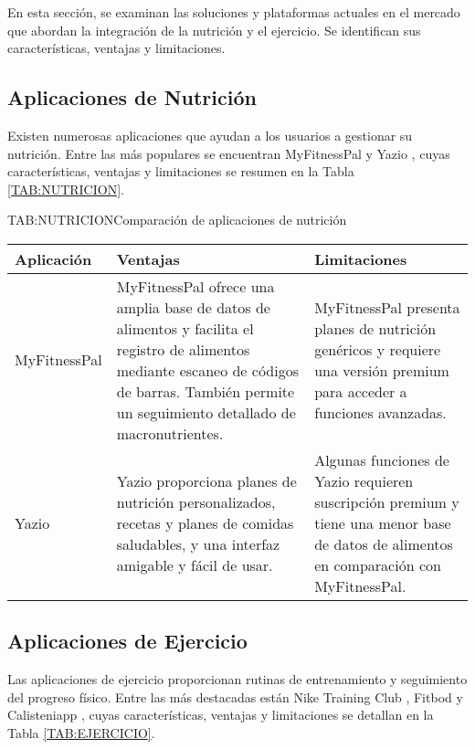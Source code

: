 En esta sección, se examinan las soluciones y plataformas actuales en el mercado que abordan la integración de la nutrición y el ejercicio. Se identifican sus características, ventajas y limitaciones.

\subsection{Aplicaciones de Nutrición}

Existen numerosas aplicaciones que ayudan a los usuarios a gestionar su nutrición. Entre las más populares se encuentran MyFitnessPal \cite{MyFitnessPal} y Yazio \cite{Yazio}, cuyas características, ventajas y limitaciones se resumen en la Tabla \ref{TAB:NUTRICION}.

\begin{table}[Comparación de aplicaciones de nutrición]{TAB:NUTRICION}{Comparación de aplicaciones de nutrición}
  \begin{tabular}{|p{3cm}|p{5cm}|p{5cm}|}
    \hline
    \textbf{Aplicación} & \textbf{Ventajas} & \textbf{Limitaciones} \\
    \hline
    MyFitnessPal & MyFitnessPal ofrece una amplia base de datos de alimentos y facilita el registro de alimentos mediante escaneo de códigos de barras. También permite un seguimiento detallado de macronutrientes. & MyFitnessPal presenta planes de nutrición genéricos y requiere una versión premium para acceder a funciones avanzadas. \\
    \hline
    Yazio & Yazio proporciona planes de nutrición personalizados, recetas y planes de comidas saludables, y una interfaz amigable y fácil de usar. & Algunas funciones de Yazio requieren suscripción premium y tiene una menor base de datos de alimentos en comparación con MyFitnessPal. \\
    \hline
  \end{tabular}
\end{table}

\subsection{Aplicaciones de Ejercicio}

Las aplicaciones de ejercicio proporcionan rutinas de entrenamiento y seguimiento del progreso físico. Entre las más destacadas están Nike Training Club \cite{NikeTrainingClub}, Fitbod \cite{Fitbod} y Calisteniapp \cite{Calisteniapp}, cuyas características, ventajas y limitaciones se detallan en la Tabla \ref{TAB:EJERCICIO}.

